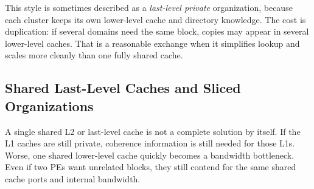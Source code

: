 This style is sometimes described as a \textit{last-level private} organization, because each cluster keeps its own lower-level cache and directory knowledge.
The cost is duplication: if several domains need the same block, copies may appear in several lower-level caches.
That is a reasonable exchange when it simplifies lookup and scales more cleanly than one fully shared cache.

\subsection*{Shared Last-Level Caches and Sliced Organizations}
A single shared L2 or last-level cache is not a complete solution by itself.
If the L1 caches are still private, coherence information is still needed for those L1s.
Worse, one shared lower-level cache quickly becomes a bandwidth bottleneck.
Even if two PEs want unrelated blocks, they still contend for the same shared cache ports and internal bandwidth.

